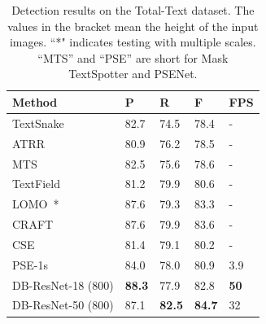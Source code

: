 \documentclass[letterpaper]{article} %
\begin{document}
\begin{table}[!ht]
\centering
\caption{Detection results on the Total-Text dataset. The values in the bracket mean the height of the input images. ``*" indicates testing with multiple scales. ``MTS'' and ``PSE'' are short for Mask TextSpotter and PSENet.}
\begin{tabularx}{1.0\linewidth}{@{}l*{4}X@{}}
\toprule
Method           & P    & R    & F    & FPS \\ \midrule
TextSnake~\cite{long2018textsnake}      & 82.7 & 74.5 & 78.4 & -   \\ 
ATRR~\cite{atrr}            & 80.9 & 76.2 & 78.5 & -   \\ 
MTS~\cite{lyu2018mask} & 82.5 & 75.6 & 78.6 & -   \\ 
TextField~\cite{xu2019textfield}        & 81.2 & 79.9 & 80.6 & -   \\ 
LOMO~\cite{lomo}*        & 87.6 & 79.3 & 83.3 & -   \\ 
CRAFT~\cite{craft}           & 87.6 & 79.9 & 83.6 & -   \\ 
CSE~\cite{cse}              & 81.4 & 79.1 & 80.2 & -   \\ 
PSE-1s~\cite{wang2019shape}        & 84.0   & 78.0   & 80.9 & 3.9 \\ 
\midrule  
DB-ResNet-18 (800)   & \textbf{88.3} & 77.9 & 82.8 & \textbf{50}  \\ 
DB-ResNet-50 (800)  & 87.1 & \textbf{82.5} & \textbf{84.7} & 32  \\ \bottomrule
\end{tabularx}
\label{tab:totaltext}
\end{table}
\end{document}
